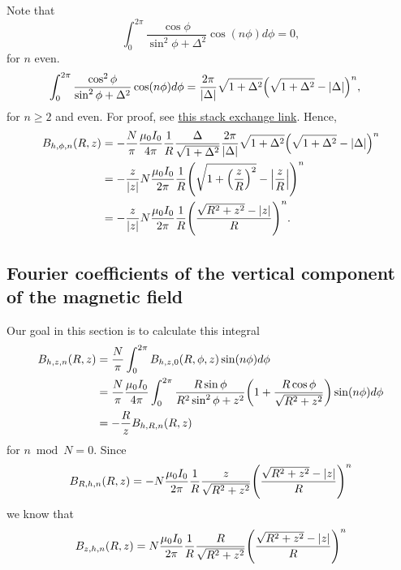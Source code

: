 \documentclass{article}
\begin{document}
Note that
\[\int_0^{2\pi} \frac{\cos\phi}{\sin^2\phi+\Delta^2}\cos(n\phi)d\phi = 0,\]
for $n$ even.
\[\begin{aligned}
\int_0^{2\pi} \frac{\cos^2\phi}{\sin^2\phi+\Delta^2}\cos(n\phi)d\phi &= \frac{2\pi}{|\Delta|}\sqrt{1 + \Delta^2}\qty(\sqrt{1+\Delta^2}-\abs{\Delta})^n,
\end{aligned}\]
for $n\ge 2$ and even. For proof, see \href{https://math.stackexchange.com/questions/5027889/how-to-express-int-pi-pi-frac-cos2x-cosnx-sin2xa2dx-as-a#5027947}{this stack exchange link}.
Hence,
\[\begin{aligned}
    B_{h, \phi, n}(R, z)&=-\frac{N}{\pi}\frac{\mu_0 I_0}{4 \pi}\frac{1}{R} \frac{\Delta}{\sqrt{1+\Delta^2}} \frac{2\pi}{|\Delta|}\sqrt{1 + \Delta^2}\qty(\sqrt{1+\Delta^2}-\abs{\Delta})^n \\
    &= -\frac{z}{\abs{z}}N\frac{\mu_0 I_0}{2 \pi}\frac{1}{R}\qty(\sqrt{1+\qty(\frac{z}{R})^2}-\abs{\frac{z}{R}})^n \\
    &= -\frac{z}{\abs{z}}N\frac{\mu_0 I_0}{2 \pi}\frac{1}{R}\qty(\frac{\sqrt{R^2+z^2}-\abs{z}}{R})^n.
\end{aligned}
\]


\subsection{Fourier coefficients of the vertical component of the magnetic field}

Our goal in this section is to calculate this integral
\[\begin{aligned}
B_{h, z, n}(R, z)&= \frac{N}{\pi}\int_0^{2\pi} B_{h, z, 0}(R, \phi, z)\sin(n\phi)d\phi \\
&=\frac{N}{\pi}\frac{\mu_0 I_0}{4 \pi}\int_0^{2\pi} \frac{R\sin\phi}{R^2\sin^2\phi+z^2}\qty(1+\frac{R\cos\phi}{\sqrt{R^2+z^2}})\sin(n\phi)d\phi \\
&= -\frac{R}{z}B_{h, R, n}(R, z)
\end{aligned}\]
for $n \bmod N = 0$.
Since
\[\begin{aligned}
B_{R, h, n}(R, z) &= -N\frac{\mu_0 I_0}{2 \pi}\frac{1}{R}\frac{z}{\sqrt{R^2+z^2}}\qty(\frac{\sqrt{R^2+z^2}-\abs{z}}{R})^n \\
\end{aligned}\]
we know that
\[\begin{aligned}
B_{z, h, n}(R, z) &= N\frac{\mu_0 I_0}{2 \pi}\frac{1}{R}\frac{R}{\sqrt{R^2+z^2}}\qty(\frac{\sqrt{R^2+z^2}-\abs{z}}{R})^n \\
\end{aligned}\]
\end{document}
